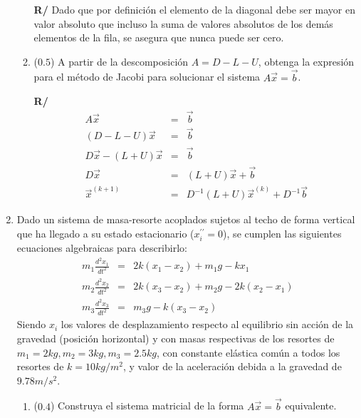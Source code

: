 \documentclass[12pt]{article}
\newcommand{\diff}[3]{\frac{d^{#3} #1}{d#2^{#3}}}
\begin{document}
\begin{enumerate}[leftmargin=*,widest=9]
\begin{enumerate}[label=\alph*]
\textbf{R/} Dado que por definición el elemento de la diagonal debe ser mayor en valor absoluto que incluso la suma de valores absolutos de los demás elementos de la fila, se asegura que nunca puede ser cero.
    \item (\(0.5\)) A partir de la descomposición \(A = D -L -U\), obtenga la expresión para el método de Jacobi para solucionar el sistema \(A\vec{x} = \vec{b}\).

\textbf{R/}
   \begin{eqnarray*}
   A\vec{x} &=& \vec{b} \\
   (D -L -U)\vec{x} &=& \vec{b} \\
   D\vec{x} - (L+U)\vec{x} &=& \vec{b} \\
   D\vec{x} &=& (L+U)\vec{x} + \vec{b} \\
   \vec{x}^{(k+1)} &=& D^{-1}(L+U)\vec{x}^{(k)} + D^{-1}\vec{b}
   \end{eqnarray*}
    \end{enumerate}
   \item Dado un sistema de masa-resorte acoplados sujetos al techo de forma vertical que ha llegado a su estado estacionario (\(x_i^{\prime\prime} = 0\)), se cumplen las siguientes ecuaciones algebraicas para describirlo:
   \begin{eqnarray*}
   m_1 \diff{x_1}{t}{2} &=& 2k(x_1-x_2)+m_1g -kx_1 \\
   m_2 \diff{x_2}{t}{2} &=& 2k(x_3-x_2)+m_2g -2k(x_2 - x_1)  \\
   m_3 \diff{x_3}{t}{2} &=& m_3g -k(x_3-x_2)
   \end{eqnarray*}
   Siendo \(x_i\) los valores de desplazamiento respecto al equilibrio sin acción de la gravedad (posición horizontal) y con masas respectivas de los resortes de \(m_1 = 2kg, m_2=3kg, m_3=2.5kg\), con constante elástica común a todos los resortes de \(k= 10kg/m^2\), y valor de la aceleración debida a la gravedad de \(9.78m/s^2\).
   \begin{enumerate}[label=\alph*]
    \item (\(0.4\)) Construya el sistema matricial de la forma \(A\vec{x} = \vec{b}\) equivalente.


\end{enumerate}
\end{enumerate}
\end{document}
